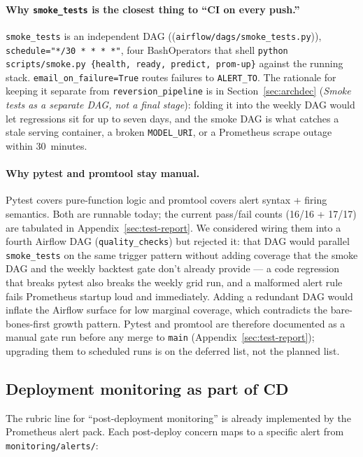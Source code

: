 \documentclass[11pt,a4paper]{article}
\begin{document}
\paragraph{Why \texttt{smoke\_tests} is the closest thing to ``CI on every push.''}
\texttt{smoke\_tests} is an independent DAG ((\texttt{airflow/dags/smoke\_tests.py})), \texttt{schedule="*/30 * * * *"}, four BashOperators that shell \texttt{python scripts/smoke.py \{health, ready, predict, prom-up\}} against the running stack. \texttt{email\_on\_failure=True} routes failures to \texttt{ALERT\_TO}. The rationale for keeping it separate from \texttt{reversion\_pipeline} is in Section~\ref{sec:archdec} (\emph{Smoke tests as a separate DAG, not a final stage}): folding it into the weekly DAG would let regressions sit for up to seven days, and the smoke DAG is what catches a stale serving container, a broken \texttt{MODEL\_URI}, or a Prometheus scrape outage within 30~minutes.

\paragraph{Why pytest and promtool stay manual.}
Pytest covers pure-function logic and promtool covers alert syntax + firing semantics. Both are runnable today; the current pass/fail counts (16/16 + 17/17) are tabulated in Appendix~\ref{sec:test-report}. We considered wiring them into a fourth Airflow DAG (\texttt{quality\_checks}) but rejected it: that DAG would parallel \texttt{smoke\_tests} on the same trigger pattern without adding coverage that the smoke DAG and the weekly backtest gate don't already provide --- a code regression that breaks pytest also breaks the weekly grid run, and a malformed alert rule fails Prometheus startup loud and immediately. Adding a redundant DAG would inflate the Airflow surface for low marginal coverage, which contradicts the bare-bones-first growth pattern. Pytest and promtool are therefore documented as a manual gate run before any merge to \texttt{main} (Appendix~\ref{sec:test-report}); upgrading them to scheduled runs is on the deferred list, not the planned list.

\subsection{Deployment monitoring as part of CD}\label{sec:cicd-monitoring}

The rubric line for ``post-deployment monitoring'' is already implemented by the Prometheus alert pack. Each post-deploy concern maps to a specific alert from \texttt{monitoring/alerts/}:
\end{document}
